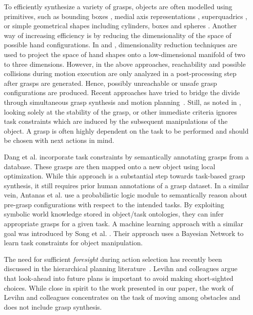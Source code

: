 \documentclass{aamas2015}
\begin{document}
To efficiently synthesize a 
variety of grasps, objects are often modelled
using primitives, such as bounding boxes \cite{huebner2008selection}, medial axis
representations \cite{przybylski2010unions}, superquadrics \cite{goldfeder2007grasp}, 
or simple geometrical shapes including cylinders, boxes and spheres \cite{miller2003automatic}.
Another way of increasing efficiency is by reducing the dimensionality of
the space of possible hand configurations. In \cite{ciocarlie2009} and \cite{benamor}, 
dimensionality reduction techniques are used to project the space of
hand shapes onto a low-dimensional manifold of two to three dimensions.
However, in the above approaches, reachability and possible collisions
during motion execution are only analyzed in a post-processing step after 
grasps are generated. Hence, possibly unreachable or unsafe grasp configurations 
are produced. Recent approaches have tried to bridge the divide through simultaneous 
grasp synthesis and motion planning~\cite{Vahrenkamp12d}. Still, as noted in \cite{dang}, 
looking solely at the stability of the grasp, or other
immediate criteria ignores task constraints which 
are induced by the subsequent manipulations of the object. 
A grasp is often highly dependent on the task 
to be performed and should be chosen with next actions in mind.

Dang et al. \cite{dang} incorporate task constraints by 
semantically annotating grasps from a database. These grasps
are then mapped onto a new object using local optimization.
While this approach is a substantial step towards task-based
grasp synthesis, it still requires prior human annotations of 
a grasp dataset. In a similar vein, Antanas et al. \cite{antanas} 
use a probabilistic logic module to semantically reason
about pre-grasp configurations with respect to the intended tasks.
By exploiting symbolic world knowledge stored in object/task ontologies,
they can infer appropriate grasps for a given task. 
A machine learning approach with a similar goal
was introduced by Song et al. \cite{song}. Their approach 
uses a Bayesian Network to learn task constraints for 
object manipulation. 

The need for sufficient \emph{foresight} 
during action selection has recently been discussed in the hierarchical
planning literature~\cite{LevihnIROS13}. Levihn and colleagues
argue that look-ahead into future plans is important to 
avoid making short-sighted choices. While close in spirit to the 
work presented in our paper, the work of Levihn and colleagues 
concentrates on the task of moving among obstacles and does not 
include grasp synthesis.
\end{document}
